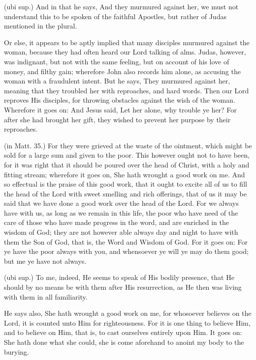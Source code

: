  (ubi sup.) And in that he says, And they murmured against her, we must not understand this to be spoken of the faithful Apostles, but rather of Judas mentioned in the plural.

 Or else, it appears to be aptly implied that many disciples murmured against the woman, because they had often heard our Lord talking of alms. Judas, however, was indignant, but not with the same feeling, but on account of his love of money, and filthy gain; wherefore John also records him alone, as accusing the woman with a fraudulent intent. But he says, They murmured against her, meaning that they troubled her with reproaches, and hard words. Then our Lord reproves His disciples, for throwing obstacles against the wish of the woman. Wherefore it goes on: And Jesus said, Let her alone, why trouble ye her? For after she had brought her gift, they wished to prevent her purpose by their reproaches.

 (in Matt. 35.) For they were grieved at the waste of the ointment, which might be sold for a large sum and given to the poor. This however ought not to have been, for it was right that it should be poured over the head of Christ, with a holy and fitting stream; wherefore it goes on, She hath wrought a good work on me. And so effectual is the praise of this good work, that it ought to excite all of us to fill the head of the Lord with sweet smelling and rich offerings, that of us it may be said that we have done a good work over the head of the Lord. For we always have with us, as long as we remain in this life, the poor who have need of the care of those who have made progress in the word, and are enriched in the wisdom of God; they are not however able always day and night to have with them the Son of God, that is, the Word and Wisdom of God. For it goes on: For ye have the poor always with you, and whensoever ye will ye may do them good; but me ye have not always.

 (ubi sup.) To me, indeed, He seems to speak of His bodily presence, that He should by no means be with them after His resurrection, as He then was living with them in all familiarity.

 He says also, She hath wrought a good work on me, for whosoever believes on the Lord, it is counted unto Him for righteousness. For it is one thing to believe Him, and to believe on Him, that is, to cast ourselves entirely upon Him. It goes on: She hath done what she could, she is come aforehand to anoint my body to the burying.

